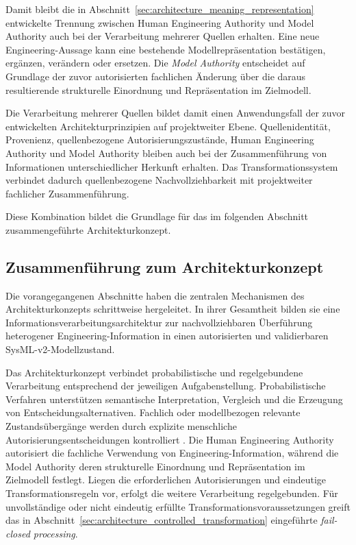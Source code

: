 Damit bleibt die in
Abschnitt~\ref{sec:architecture_meaning_representation} entwickelte Trennung
zwischen Human Engineering Authority und Model Authority auch bei der
Verarbeitung mehrerer Quellen erhalten. Eine neue Engineering-Aussage kann
eine bestehende Modellrepräsentation bestätigen, ergänzen, verändern oder
ersetzen. Die \emph{Model Authority} entscheidet auf Grundlage der zuvor
autorisierten fachlichen Änderung über die daraus resultierende strukturelle
Einordnung und Repräsentation im Zielmodell.

Die Verarbeitung mehrerer Quellen bildet damit einen Anwendungsfall der
zuvor entwickelten Architekturprinzipien auf projektweiter Ebene.
Quellenidentität, Provenienz, quellenbezogene Autorisierungszustände, Human
Engineering Authority und Model Authority bleiben auch bei der
Zusammenführung von Informationen unterschiedlicher Herkunft erhalten. Das
Transformationssystem verbindet dadurch quellenbezogene Nachvollziehbarkeit
mit projektweiter fachlicher Zusammenführung.

Diese Kombination bildet die Grundlage für das im folgenden Abschnitt
zusammengeführte Architekturkonzept.

\subsection{Zusammenführung zum Architekturkonzept}
\label{sec:architecture_integrated_concept}

Die vorangegangenen Abschnitte haben die zentralen Mechanismen des
Architekturkonzepts schrittweise hergeleitet. In ihrer Gesamtheit bilden sie
eine Informationsverarbeitungsarchitektur zur nachvollziehbaren Überführung
heterogener Engineering-Information in einen autorisierten und validierbaren
SysML-v2-Modellzustand.

Das Architekturkonzept verbindet probabilistische und regelgebundene
Verarbeitung entsprechend der jeweiligen Aufgabenstellung.
Probabilistische Verfahren unterstützen semantische Interpretation, Vergleich
und die Erzeugung von Entscheidungsalternativen. Fachlich oder modellbezogen
relevante Zustandsübergänge werden durch explizite menschliche
Autorisierungsentscheidungen kontrolliert
\cite{Topcu2025,Stein2026}. Die Human Engineering Authority autorisiert die
fachliche Verwendung von Engineering-Information, während die Model Authority
deren strukturelle Einordnung und Repräsentation im Zielmodell festlegt.
Liegen die erforderlichen Autorisierungen und eindeutige
Transformationsregeln vor, erfolgt die weitere Verarbeitung regelgebunden.
Für unvollständige oder nicht eindeutig erfüllte
Transformationsvoraussetzungen greift das in
Abschnitt~\ref{sec:architecture_controlled_transformation} eingeführte
\emph{fail-closed processing}.


